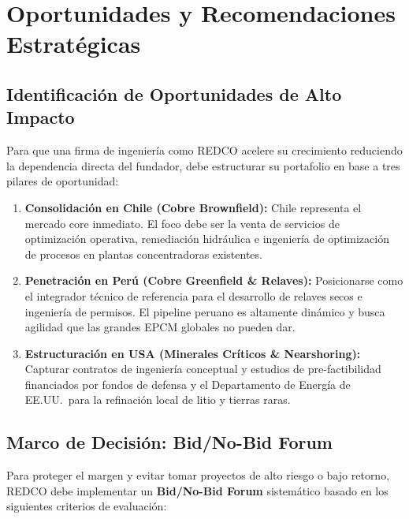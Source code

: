 \chapter{Oportunidades y Recomendaciones Estratégicas}

\section{Identificación de Oportunidades de Alto Impacto}

Para que una firma de ingeniería como REDCO acelere su crecimiento reduciendo la dependencia directa del fundador, debe estructurar su portafolio en base a tres pilares de oportunidad:

\begin{enumerate}
    \item \textbf{Consolidación en Chile (Cobre Brownfield):} Chile representa el mercado core inmediato. El foco debe ser la venta de servicios de optimización operativa, remediación hidráulica e ingeniería de optimización de procesos en plantas concentradoras existentes.
    \item \textbf{Penetración en Perú (Cobre Greenfield \& Relaves):} Posicionarse como el integrador técnico de referencia para el desarrollo de relaves secos e ingeniería de permisos. El pipeline peruano es altamente dinámico y busca agilidad que las grandes EPCM globales no pueden dar.
    \item \textbf{Estructuración en USA (Minerales Críticos \& Nearshoring):} Capturar contratos de ingeniería conceptual y estudios de pre-factibilidad financiados por fondos de defensa y el Departamento de Energía de EE.UU.\ para la refinación local de litio y tierras raras.
\end{enumerate}

\section{Marco de Decisión: Bid/No-Bid Forum}

Para proteger el margen y evitar tomar proyectos de alto riesgo o bajo retorno, REDCO debe implementar un \textbf{Bid/No-Bid Forum} sistemático basado en los siguientes criterios de evaluación:

